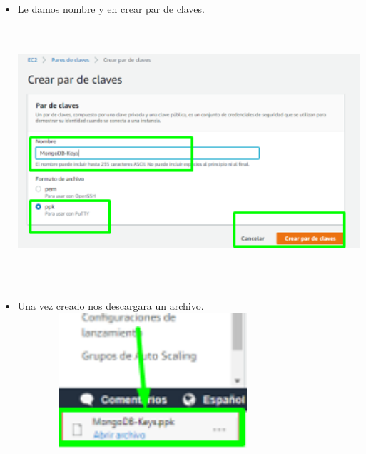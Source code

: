 \documentclass[12pt,a4paper,oneside]{book}
\begin{document}
\newpage
\begin{itemize}
	\item {Le damos nombre y en crear par de claves.}\\
	
	\includegraphics[width=16cm, height=10cm]{img/5.png}\\
	
	\item {Una vez creado nos descargara un archivo.}\\
	
	\includegraphics[width=10cm, height=5cm]{img/6.png}\\
	
\end{itemize}
\end{document}

